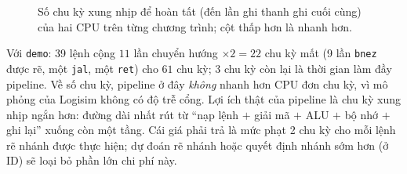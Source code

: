 \documentclass[11pt,a4paper]{article}
\begin{document}
\begin{figure}[htbp]
\caption{Số chu kỳ xung nhịp để hoàn tất (đến lần ghi thanh ghi cuối cùng) của hai CPU trên từng chương trình; cột thấp hơn là nhanh hơn.}
\label{fig:chart}
\end{figure}

Với \texttt{demo}: 39 lệnh cộng $11$ lần chuyển hướng $\times2=22$ chu kỳ mất (9 lần \texttt{bnez} được rẽ, một \texttt{jal}, một \texttt{ret}) cho $61$ chu kỳ; $3$ chu kỳ còn lại là thời gian làm đầy pipeline.
Về số chu kỳ, pipeline ở đây \emph{không} nhanh hơn CPU đơn chu kỳ, vì mô phỏng của Logisim không có độ trễ cổng. Lợi ích thật của pipeline là chu kỳ xung nhịp ngắn hơn: đường dài nhất rút từ
``nạp lệnh $+$ giải mã $+$ ALU $+$ bộ nhớ $+$ ghi lại'' xuống còn một tầng. Cái giá phải trả là mức phạt 2 chu kỳ cho mỗi lệnh rẽ nhánh được thực hiện; dự đoán rẽ nhánh hoặc quyết định nhánh sớm hơn (ở ID) sẽ loại bỏ phần lớn chi phí này.

\end{document}
